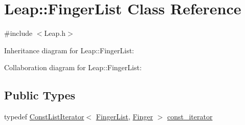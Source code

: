 \hypertarget{class_leap_1_1_finger_list}{}\section{Leap\+:\+:Finger\+List Class Reference}
\label{class_leap_1_1_finger_list}


{\ttfamily \#include $<$Leap.\+h$>$}



Inheritance diagram for Leap\+:\+:Finger\+List\+:


Collaboration diagram for Leap\+:\+:Finger\+List\+:
\subsection*{Public Types}
\begin{DoxyCompactItemize}
\item 
typedef \hyperlink{class_leap_1_1_const_list_iterator}{Const\+List\+Iterator}$<$ \hyperlink{class_leap_1_1_finger_list}{Finger\+List}, \hyperlink{class_leap_1_1_finger}{Finger} $>$ \hyperlink{class_leap_1_1_finger_list_a9ecff6e555096064a09bb66a8cb5e567}{const\+\_\+iterator}
\end{DoxyCompactItemize}
